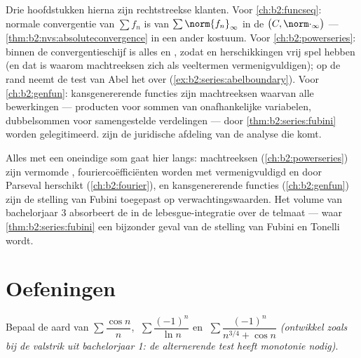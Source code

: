 \begin{remark}\label{rem:b2:series:perspectives}
Drie hoofdstukken hierna zijn rechtstreekse klanten. Voor
\cref{ch:b2:funcseq}: normale convergentie van $\sum f_n$ is
 van $\sum\norm{f_n}_\infty$ in de
 $\bigl(C, \norm\cdot_\infty\bigr)$ ---
\cref{thm:b2:nvs:absoluteconvergence} in een ander kostuum. Voor
\cref{ch:b2:powerseries}: binnen de convergentieschijf is alles
 en , zodat  en herschikkingen
vrij spel hebben (en dat is waarom machtreeksen zich als
veeltermen vermenigvuldigen); op de rand neemt de test van Abel het
over (\cref{ex:b2:series:abelboundary}). Voor
\cref{ch:b2:genfun}: kansgenererende functies zijn machtreeksen
waarvan alle bewerkingen --- producten voor sommen van
onafhankelijke variabelen, dubbelsommen voor samengestelde
verdelingen --- door \cref{thm:b2:series:fubini} worden
gelegitimeerd.  zijn de juridische afdeling van
de analyse die komt.
\end{remark}

\begin{remark}
Alles met een oneindige som gaat hier langs: machtreeksen
(\cref{ch:b2:powerseries}) zijn vermomde ,
fouriercoëfficiënten worden met  vermenigvuldigd en
door Parseval herschikt (\cref{ch:b2:fourier}), en
kansgenererende functies (\cref{ch:b2:genfun}) zijn de stelling
van Fubini toegepast op verwachtingswaarden. Het volume van
bachelorjaar 3 absorbeert de  in de
lebesgue-integratie over de telmaat --- waar
\cref{thm:b2:series:fubini} een bijzonder geval van de stelling van
Fubini en Tonelli wordt.
\end{remark}

\section{Oefeningen}

\begin{exercise}[$\star$]\label{exo:b2:series:1}
Bepaal de aard van $\sum \dfrac{\cos n}{n}$, $\;\sum
\dfrac{(-1)^n}{\ln n}$ en $\;\sum \dfrac{(-1)^n}{n^{3/4} + \cos n}$
\emph{(ontwikkel zoals bij de valstrik uit bachelorjaar 1: de
alternerende test heeft monotonie nodig)}.
\end{exercise}

